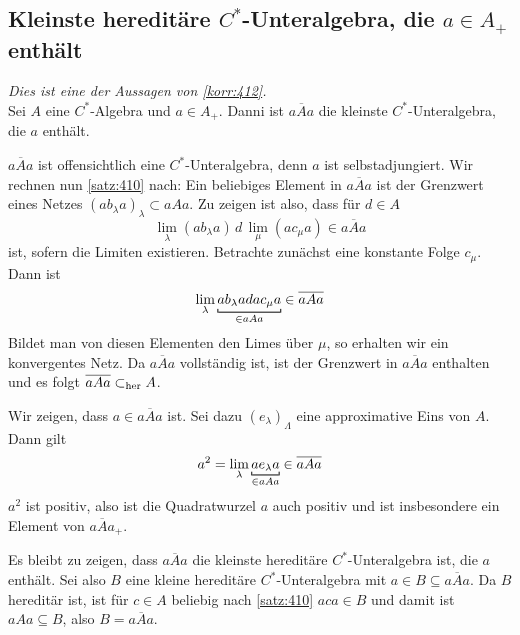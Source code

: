 \subsection{Kleinste hereditäre $C^*$-Unteralgebra, die $a \in A_+$ enthält} %
\label{sub:her_kleinste}
\emph{Dies ist eine der Aussagen von \autoref{korr:412}.}\smallskip\\
Sei $A$ eine $C^*$-Algebra und $a \in  A_+$.
Danni ist $\overline{aAa}$ die kleinste $C^*$-Unteralgebra, die $a$ enthält.
\begin{beweis}
	$\overline{aAa}$ ist offensichtlich eine $C^*$-Unteralgebra, denn $a$ ist selbstadjungiert.
	Wir rechnen nun \autoref{satz:410} nach:
	Ein beliebiges Element in $\overline{aAa}$ ist der Grenzwert eines Netzes $(ab_\lambda a)_\lambda \subset aAa$.
	Zu zeigen ist also, dass für $d \in A$
	\[
		\lim_\lambda(ab_\lambda a)\, d \,\lim_{\mu} (a c_\mu a) \in \overline{aAa}
	\]
	ist, sofern die Limiten existieren.
	Betrachte zunächst eine konstante Folge $c_\mu$.
	Dann ist 
	\[
		\lim_\lambda \Underbracket{a b_\lambda a d a c_\mu a}{\in aAa} \in \overline{aAa}
	\]
	Bildet man von diesen Elementen den Limes über $\mu$, so erhalten wir ein konvergentes Netz.
	Da $\overline{a A a}$ vollständig ist, ist der Grenzwert in $\overline{aAa}$ enthalten und es folgt $\overline{a A a}\subset_{\operatorname{her}} A$.
	
	Wir zeigen, dass $a \in \overline{aAa}$ ist.
	Sei dazu $(e_\lambda)_\Lambda$ eine approximative Eins von $A$.
	Dann gilt
	\[
		a^2 = \lim_\lambda \Underbracket{a e_\lambda a}{\in aAa} \in \overline{a A a}
	\]
	$a^2$ ist positiv, also ist die Quadratwurzel $a$ auch positiv und ist insbesondere ein Element von $\overline{a Aa}_+$.
	
	Es bleibt zu zeigen, dass $\overline{a A a}$ die kleinste hereditäre $C^*$-Unteralgebra ist, die $a$ enthält.
	Sei also $B$ eine kleine hereditäre $C^*$-Unteralgebra mit $a \in B \subseteq \overline{aAa}$.
	Da $B$ hereditär ist, ist für $c \in A$ beliebig nach \autoref{satz:410} $aca \in B$ und damit ist $a A a \subseteq B$, also $B=\overline{aAa}$.
\end{beweis}


